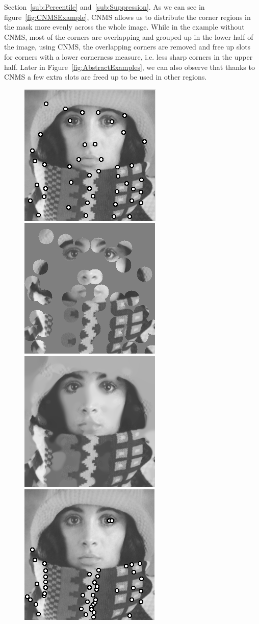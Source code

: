 Section~\ref{sub:Percentile} and~\ref{sub:Suppression}. As we can see in
figure~\ref{fig:CNMSExample}, CNMS allows us to distribute the corner regions in the mask more
evenly across the whole image. While in the example without CNMS, most of the corners are
overlapping and grouped up in the lower half of the image, using CNMS, the overlapping corners are
removed and free up slots for corners with a lower cornerness measure, i.e. less sharp corners in
the upper half. Later in Figure~\ref{fig:AbstractExamples}, we can also observe that thanks to
CNMS a few extra slots are freed up to be used in other regions.\\
\begin{figure}
    \centering
    \includegraphics[width=0.31\linewidth]{../Images/trui/trui_corners_cnms.png}
    \includegraphics[width=0.31\linewidth]{../Images/trui/trui-mask_cnms.png}
    \includegraphics[width=0.31\linewidth]{../Images/trui/trui-inpaint_cnms.png}\\
    \vspace{0.2cm}
    \includegraphics[width=0.31\linewidth]{../Images/trui/trui_corners_non_cnms.png}

\end{figure}
